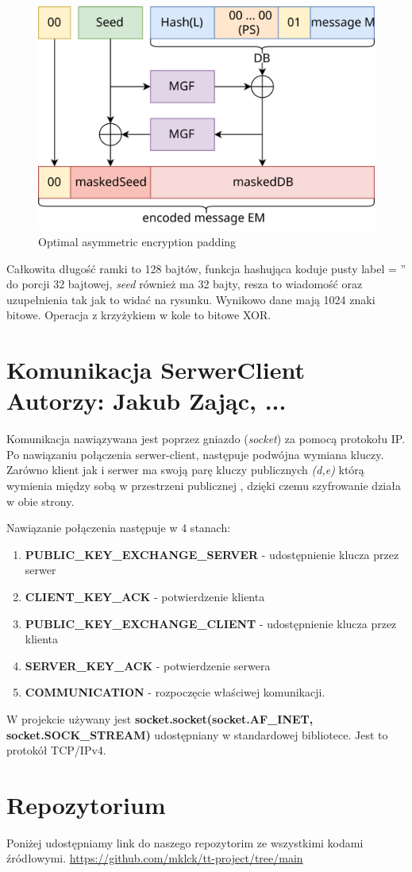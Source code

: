\documentclass[a4paper,12pt]{article}
\begin{document}
\begin{figure}
\centerline{\includegraphics[scale=0.2]{OAEP.png}}
\caption{Optimal asymmetric encryption padding}
\end{figure}
Całkowita długość ramki to 128 bajtów, funkcja hashująca koduje pusty label = '' do porcji 32 bajtowej, \textit{seed} również ma 32 bajty, resza to wiadomość oraz uzupełnienia tak jak to widać na rysunku. Wynikowo dane mają 1024 znaki bitowe. Operacja z krzyżykiem w kole to bitowe XOR.


\section{Komunikacja SerwerClient \color{red} Autorzy: Jakub Zając, ... }
Komunikacja nawiązywana jest poprzez gniazdo (\textit{socket}) za pomocą protokołu IP. Po nawiązaniu połączenia serwer-client, następuje podwójna wymiana kluczy. Zarówno klient jak i serwer ma swoją parę kluczy publicznych \textit{(d,e)} którą wymienia między sobą w przestrzeni publicznej , dzięki czemu szyfrowanie działa w obie strony.  

Nawiązanie połączenia następuje w 4 stanach: 
\begin{enumerate}
\item \textbf{PUBLIC\_KEY\_EXCHANGE\_SERVER} - udostępnienie klucza przez serwer  \item \textbf{CLIENT\_KEY\_ACK} - potwierdzenie klienta \item \textbf{PUBLIC\_KEY\_EXCHANGE\_CLIENT} - udostępnienie klucza przez klienta  \item \textbf{SERVER\_KEY\_ACK} - potwierdzenie serwera  
\item \textbf{COMMUNICATION} - rozpoczęcie właściwej komunikacji.
\end{enumerate}
W projekcie używany jest \textbf{socket.socket(socket.AF\_INET, socket.SOCK\_STREAM)} udostępniany w standardowej bibliotece. Jest to protokół TCP/IPv4.



\section{Repozytorium}
Poniżej udostępniamy link do naszego repozytorim ze wszystkimi kodami źródłowymi.
\newline
\url{https://github.com/mklck/tt-project/tree/main}
\end{document}
